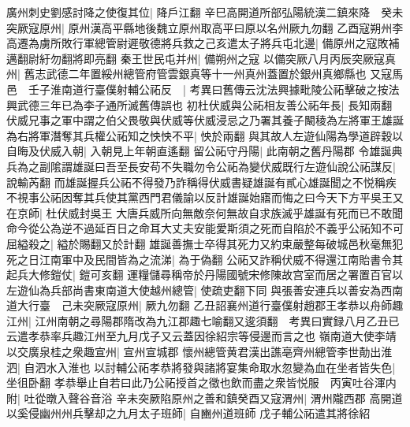 廣州刺史劉感討降之使復其位|{
	降戶江翻}
辛巳高開道所部弘陽統漢二鎮來降　癸未突厥寇原州|{
	原州漢高平縣地後魏立原州取高平曰原以名州厥九勿翻}
乙酉寇朔州李高遷為虜所敗行軍總管尉遲敬德將兵救之己亥遣太子將兵屯北邊|{
	備原州之寇敗補邁翻尉紆勿翻將即亮翻}
秦王世民屯并州|{
	備朔州之寇}
以備突厥八月丙辰突厥寇真州|{
	舊志武德二年置綏州總管府管雲銀真等十一州真州蓋置於銀州真鄉縣也}
又寇馬邑　壬子淮南道行臺僕射輔公祏反　|{
	考異曰舊傳云沈法興據毗陵公祏擊破之按法興武德三年已為李子通所滅舊傳誤也}
初杜伏威與公祏相友善公祏年長|{
	長知兩翻}
伏威兄事之軍中謂之伯父畏敬與伏威等伏威浸忌之乃署其養子闞稜為左將軍王雄誕為右將軍潛奪其兵權公祏知之怏怏不平|{
	怏於兩翻}
與其故人左遊仙陽為學道辟穀以自晦及伏威入朝|{
	入朝見上年朝直遙翻}
留公祏守丹陽|{
	此南朝之舊丹陽郡}
令雄誕典兵為之副隂謂雄誕曰吾至長安苟不失職勿令公祏為變伏威既行左遊仙說公祏謀反|{
	說輸芮翻}
而雄誕握兵公祏不得發乃詐稱得伏威書疑雄誕有貳心雄誕聞之不悦稱疾不視事公祏因奪其兵使其黨西門君儀諭以反計雄誕始寤而悔之曰今天下方平吳王又在京師|{
	杜伏威封吳王}
大唐兵威所向無敵奈何無故自求族滅乎雄誕有死而已不敢聞命今從公為逆不過延百日之命耳大丈夫安能愛斯須之死而自陷於不義乎公祏知不可屈縊殺之|{
	縊於賜翻又於計翻}
雄誕善撫士卒得其死力又約束嚴整每破城邑秋毫無犯死之日江南軍中及民間皆為之流涕|{
	為于偽翻}
公祏又詐稱伏威不得還江南貽書令其起兵大修鎧仗|{
	鎧可亥翻}
運糧儲尋稱帝於丹陽國號宋修陳故宫室而居之署置百官以左遊仙為兵部尚書東南道大使越州總管|{
	使疏吏翻下同}
與張善安連兵以善安為西南道大行臺　己未突厥寇原州|{
	厥九勿翻}
乙丑詔襄州道行臺僕射趙郡王孝恭以舟師趣江州|{
	江州南朝之尋陽郡隋改為九江郡趣七喻翻又逡須翻　考異曰實録八月乙丑已云遣孝恭率兵趣江州至九月戊子又云蓋因徐紹宗等侵邊而言之也}
嶺南道大使李靖以交廣泉桂之衆趣宣州|{
	宣州宣城郡}
懷州總管黄君漢出譙亳齊州總管李世勣出淮泗|{
	自泗水入淮也}
以討輔公祏孝恭將發與諸將宴集命取水忽變為血在坐者皆失色|{
	坐徂卧翻}
孝恭舉止自若曰此乃公祏授首之徵也飲而盡之衆皆悦服　丙寅吐谷渾内附|{
	吐從暾入聲谷音浴}
辛未突厥陷原州之善和鎮癸酉又寇渭州|{
	渭州隴西郡}
高開道以奚侵幽州州兵擊却之九月太子班師|{
	自豳州道班師}
戊子輔公祏遣其將徐紹

